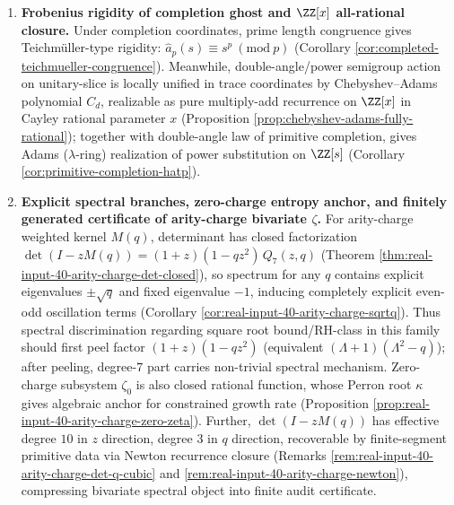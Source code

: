 \begin{enumerate}
  \item \textbf{Frobenius rigidity of completion ghost and \texorpdfstring{$\ZZ[x]$}{Z[x]} all-rational closure.}
  Under completion coordinates, prime length congruence gives Teichm\"uller-type rigidity: \(\widehat a_p(s)\equiv s^p\ (\mathrm{mod}\ p)\) (Corollary \ref{cor:completed-teichmueller-congruence}).
  Meanwhile, double-angle/power semigroup action on unitary-slice is locally unified in trace coordinates by Chebyshev--Adams polynomial \(C_d\), realizable as pure multiply-add recurrence on \(\ZZ[x]\) in Cayley rational parameter \(x\) (Proposition \ref{prop:chebyshev-adams-fully-rational}); together with double-angle law of primitive completion, gives Adams (\(\lambda\)-ring) realization of power substitution on \(\ZZ[s]\) (Corollary \ref{cor:primitive-completion-hatp}).

  \item \textbf{Explicit spectral branches, zero-charge entropy anchor, and finitely generated certificate of arity-charge bivariate \texorpdfstring{$\zeta$}{zeta}.}
  For arity-charge weighted kernel \(M(q)\), determinant has closed factorization \(\det(I-zM(q))=(1+z)(1-qz^2)\,Q_7(z,q)\) (Theorem \ref{thm:real-input-40-arity-charge-det-closed}), so spectrum for any \(q\) contains explicit eigenvalues \(\pm\sqrt q\) and fixed eigenvalue \(-1\), inducing completely explicit even-odd oscillation terms (Corollary \ref{cor:real-input-40-arity-charge-sqrtq}).
  Thus spectral discrimination regarding square root bound/RH-class in this family should first peel factor \((1+z)(1-qz^2)\) (equivalent \((\Lambda+1)(\Lambda^2-q)\)); after peeling, degree-\(7\) part carries non-trivial spectral mechanism.
  Zero-charge subsystem \(\zeta_0\) is also closed rational function, whose Perron root \(\kappa\) gives algebraic anchor for constrained growth rate (Proposition \ref{prop:real-input-40-arity-charge-zero-zeta}).
  Further, \(\det(I-zM(q))\) has effective degree \(10\) in \(z\) direction, degree \(3\) in \(q\) direction, recoverable by finite-segment primitive data via Newton recurrence closure (Remarks \ref{rem:real-input-40-arity-charge-det-q-cubic} and \ref{rem:real-input-40-arity-charge-newton}), compressing bivariate spectral object into finite audit certificate.
\end{enumerate}


